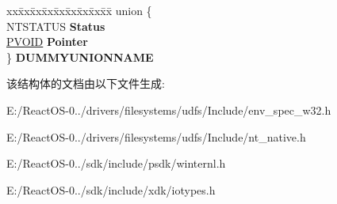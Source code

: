 \begin{DoxyCompactItemize}
\begin{tabbing}
\end{tabbing}\item 
\mbox{\label{struct___i_o___s_t_a_t_u_s___b_l_o_c_k_afc19363fab5db49d6a3a6e5e817daa0c}} 
\begin{tabbing}
xx\=xx\=xx\=xx\=xx\=xx\=xx\=xx\=xx\=\kill
union \{\\
\>NTSTATUS {\bfseries Status}\\
\>\hyperlink{interfacevoid}{PVOID} {\bfseries Pointer}\\
\} {\bfseries DUMMYUNIONNAME}\\

\end{tabbing}\end{DoxyCompactItemize}


该结构体的文档由以下文件生成\+:\begin{DoxyCompactItemize}
\item 
E\+:/\+React\+O\+S-\/0../drivers/filesystems/udfs/\+Include/env\+\_\+spec\+\_\+w32.\+h\item 
E\+:/\+React\+O\+S-\/0../drivers/filesystems/udfs/\+Include/nt\+\_\+native.\+h\item 
E\+:/\+React\+O\+S-\/0../sdk/include/psdk/winternl.\+h\item 
E\+:/\+React\+O\+S-\/0../sdk/include/xdk/iotypes.\+h\end{DoxyCompactItemize}
